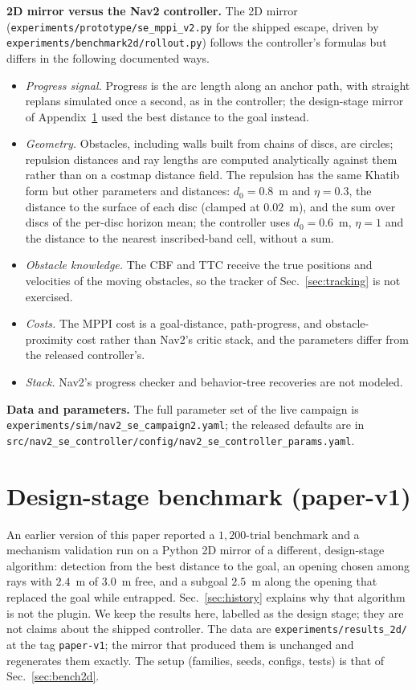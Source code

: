 \documentclass[journal]{IEEEtran}
\begin{document}
\textbf{2D mirror versus the Nav2 controller.} The 2D mirror
(\texttt{experiments/prototype/se\_mppi\_v2.py} for the shipped escape, driven by
\texttt{experiments/benchmark2d/rollout.py}) follows the controller's formulas but differs in the following
documented ways.
\begin{itemize}
\item \emph{Progress signal.} Progress is the arc length along an anchor path, with straight replans
  simulated once a second, as in the controller; the design-stage mirror of Appendix~\ref{app:v1} used
  the best distance to the goal instead.
\item \emph{Geometry.} Obstacles, including walls built from chains of discs, are circles; repulsion
  distances and ray lengths are computed analytically against them rather than on a costmap distance field.
  The repulsion has the same Khatib form but other parameters and distances: $d_0=0.8$~m and
  $\eta=0.3$, the distance to the surface of each disc (clamped at $0.02$~m), and the sum over
  discs of the per-disc horizon mean; the controller uses $d_0=0.6$~m, $\eta=1$ and the
  distance to the nearest inscribed-band cell, without a sum.
\item \emph{Obstacle knowledge.} The CBF and TTC receive the true positions and velocities of the moving
  obstacles, so the tracker of Sec.~\ref{sec:tracking} is not exercised.
\item \emph{Costs.} The MPPI cost is a goal-distance, path-progress, and obstacle-proximity cost rather than
  Nav2's critic stack, and the parameters differ from the released controller's.
\item \emph{Stack.} Nav2's progress checker and behavior-tree recoveries are not modeled.
\end{itemize}

\textbf{Data and parameters.} The full parameter set of the live campaign is
\texttt{experiments/sim/nav2\_se\_campaign2.yaml}; the released defaults are in
\texttt{src/nav2\_se\_controller/config/}\allowbreak\texttt{nav2\_se\_controller\_params.yaml}.

\section{Design-stage benchmark (paper-v1)}
\label{app:v1}

An earlier version of this paper reported a $1{,}200$-trial benchmark and a mechanism validation run
on a Python 2D mirror of a different, design-stage algorithm: detection from the best distance to the
goal, an opening chosen among rays with $2.4$~m of $3.0$~m free, and a subgoal $2.5$~m along the opening
that replaced the goal while entrapped. Sec.~\ref{sec:history} explains why that algorithm is not the plugin.
We keep the results here, labelled as the design stage; they are not claims about the shipped controller.
The data are \texttt{experiments/results\_2d/} at the tag \texttt{paper-v1}; the mirror that produced them is unchanged and
regenerates them exactly. The setup (families, seeds, configs, tests) is that of
Sec.~\ref{sec:bench2d}.
\end{document}
